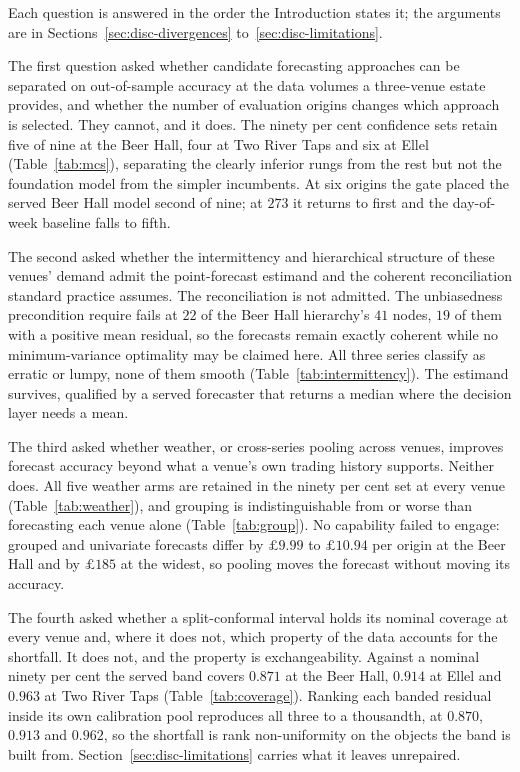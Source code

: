 Each question is answered in the order the Introduction states it; the arguments are in
Sections~\ref{sec:disc-divergences} to~\ref{sec:disc-limitations}.

The first question asked whether candidate forecasting approaches can be separated on
out-of-sample accuracy at the data volumes a three-venue estate provides, and whether the number
of evaluation origins changes which approach is selected. They cannot, and it does. The ninety
per cent confidence sets retain five of nine at the Beer Hall, four at Two River Taps and six at
Ellel (Table~\ref{tab:mcs}), separating the clearly inferior rungs from the rest but not the
foundation model from the simpler incumbents. At six origins the gate placed
the served Beer Hall model second of nine; at $273$ it returns to first and the day-of-week
baseline falls to fifth.

The second asked whether the intermittency and hierarchical structure of these venues' demand
admit the point-forecast estimand and the coherent reconciliation standard practice assumes. The
reconciliation is not admitted. The unbiasedness precondition
\citet{wickramasuriya_optimal_2019} require fails at $22$ of the Beer Hall hierarchy's $41$
nodes, $19$ of them with a positive mean residual, so the forecasts remain exactly coherent while
no minimum-variance optimality may be claimed here. All three series
classify as erratic or lumpy, none of them smooth (Table~\ref{tab:intermittency}). The estimand
survives, qualified by a served forecaster that returns a median where the decision layer needs a
mean.

The third asked whether weather, or cross-series pooling across venues, improves forecast
accuracy beyond what a venue's own trading history supports. Neither does. All five weather arms
are retained in the ninety per cent set at every venue (Table~\ref{tab:weather}), and grouping is
indistinguishable from or worse than forecasting each venue alone (Table~\ref{tab:group}). No
capability failed to engage: grouped and univariate forecasts differ by $\pounds 9.99$ to
$\pounds 10.94$ per origin at the Beer Hall and by $\pounds 185$ at the widest, so pooling moves
the forecast without moving its accuracy.

The fourth asked whether a split-conformal interval holds its nominal coverage at every venue
and, where it does not, which property of the data accounts for the shortfall. It does not, and
the property is exchangeability. Against a nominal ninety per cent the served band covers $0.871$
at the Beer Hall, $0.914$ at Ellel and $0.963$ at Two River Taps (Table~\ref{tab:coverage}).
Ranking each banded residual inside its own calibration pool reproduces all three to a
thousandth, at $0.870$, $0.913$ and $0.962$, so the shortfall is rank non-uniformity on the
objects the band is built from. Section~\ref{sec:disc-limitations} carries what it leaves
unrepaired.


